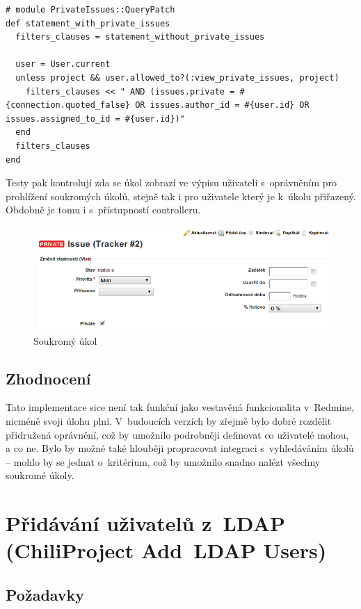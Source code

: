 \documentclass[thesis=B,czech]{FITthesis}[2012/05/02]
\begin{document}
\begin{lstlisting}
# module PrivateIssues::QueryPatch
def statement_with_private_issues
  filters_clauses = statement_without_private_issues

  user = User.current
  unless project && user.allowed_to?(:view_private_issues, project)
    filters_clauses << " AND (issues.private = #{connection.quoted_false} OR issues.author_id = #{user.id} OR issues.assigned_to_id = #{user.id})"
  end
  filters_clauses
end
\end{lstlisting}
Testy pak kontrolují zda se úkol zobrazí ve výpisu uživateli
s~oprávněním pro prohlížení soukromých úkolů, stejně tak i pro uživatele
který je k~úkolu přiřazený. Obdobně je tomu i s~přístupností
controlleru.

\begin{figure}[tbp]
\centering
\centerline{\includegraphics[width=1.2\textwidth]{issues-gui1.png}}
\caption{Soukromý úkol}
\end{figure}

\subsection{Zhodnocení}

Tato implementace sice není tak funkční jako vestavěná funkcionalita
v~Redmine, nicméně svoji úlohu plní. V~budoucích verzích by zřejmě bylo
dobré rozdělit přidružená oprávnění, což by umožnilo podrobněji
definovat co uživatelé mohou, a co ne. Bylo by možné také hlouběji
propracovat integraci s~vyhledáváním úkolů -- mohlo by se jednat
o~kritérium, což by umožnilo snadno nalézt všechny soukromé úkoly.

\section[Přidávání uživatelů z~LDAP]{Přidávání uživatelů z~LDAP (ChiliProject Add~LDAP Users)}
\label{sec:add_ldap_users}

\subsection{Požadavky}
\end{document}
